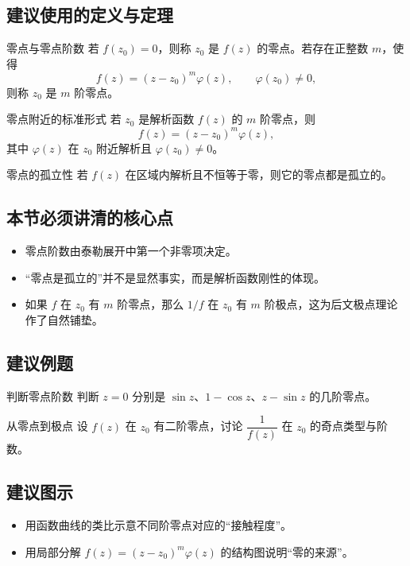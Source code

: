 \subsection*{建议使用的定义与定理}
\begin{dingliyi}{零点与零点阶数}{}
若 $f(z_0)=0$，则称 $z_0$ 是 $f(z)$ 的零点。若存在正整数 $m$，使得
\[
    f(z) = (z-z_0)^m \varphi(z), \qquad \varphi(z_0) \neq 0,
\]
则称 $z_0$ 是 $m$ 阶零点。
\end{dingliyi}

\begin{dingli}{零点附近的标准形式}{}
若 $z_0$ 是解析函数 $f(z)$ 的 $m$ 阶零点，则
\[
    f(z) = (z-z_0)^m \varphi(z),
\]
其中 $\varphi(z)$ 在 $z_0$ 附近解析且 $\varphi(z_0)\neq 0$。
\end{dingli}

\begin{dingli}{零点的孤立性}{}
若 $f(z)$ 在区域内解析且不恒等于零，则它的零点都是孤立的。
\end{dingli}

\subsection*{本节必须讲清的核心点}
\begin{itemize}
    \item 零点阶数由泰勒展开中第一个非零项决定。
    \item ``零点是孤立的''并不是显然事实，而是解析函数刚性的体现。
    \item 如果 $f$ 在 $z_0$ 有 $m$ 阶零点，那么 $1/f$ 在 $z_0$ 有 $m$ 阶极点，这为后文极点理论作了自然铺垫。
\end{itemize}

\subsection*{建议例题}
\begin{lizi}{判断零点阶数}{}
判断 $z=0$ 分别是 $\sin z$、$1-\cos z$、$z-\sin z$ 的几阶零点。
\end{lizi}

\begin{lizi}{从零点到极点}{}
设 $f(z)$ 在 $z_0$ 有二阶零点，讨论 $\dfrac{1}{f(z)}$ 在 $z_0$ 的奇点类型与阶数。
\end{lizi}

\subsection*{建议图示}
\begin{itemize}
    \item 用函数曲线的类比示意不同阶零点对应的``接触程度''。
    \item 用局部分解 $f(z)=(z-z_0)^m\varphi(z)$ 的结构图说明``零的来源''。
\end{itemize}

